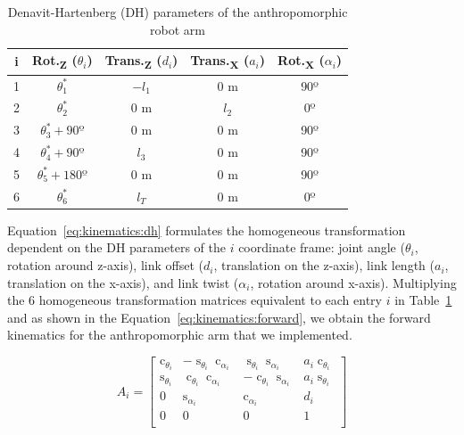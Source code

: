 \documentclass[10pt,a4paper,notitlepage,twocolumn,twoside]{article}
\DeclareMathOperator{\ssin}{s}
\DeclareMathOperator{\scos}{c}
\begin{document}
\begin{table}[!t]
  \renewcommand{\arraystretch}{1.25}
  \setlength{\tabcolsep}{2pt}
  \caption{Denavit-Hartenberg (DH) parameters of the anthropomorphic robot arm}
  \label{tab:kinematics:dh}
  \centering
  \begin{tabular}{c | c c c c}

\hline
\textbf{i} & \textbf{Rot.\textsubscript{Z}} ($\theta_i$) & \textbf{Trans.\textsubscript{Z}} ($d_i$) & \textbf{Trans.\textsubscript{X}} ($a_i$) & \textbf{Rot.\textsubscript{X}} ($\alpha_i$)\\
\hline
1 & $\theta_1^*$             & $-l_1$ & 0 m   & 90º\\
2 & $\theta_2^*$             & 0 m    & $l_2$ & 0º\\
3 & $\theta_3^*+90\text{º}$  & 0 m    & 0 m   & 90º\\
4 & $\theta_4^*+90\text{º}$  & $l_3$  & 0 m   & 90º\\
5 & $\theta_5^*+180\text{º}$ & 0 m    & 0 m   & 90º\\
6 & $\theta_6^*$             & $l_T$  & 0 m   & 0º\\
\hline

  \end{tabular}
\end{table}

Equation~\ref{eq:kinematics:dh} formulates the homogeneous transformation dependent on the DH parameters of the $i$ coordinate frame: joint angle ($\theta_i$, rotation around z-axis), link offset ($d_i$, translation on the z-axis), link length ($a_i$, translation on the x-axis), and link twist ($\alpha_i$, rotation around x-axis). Multiplying the 6 homogeneous transformation matrices equivalent to each entry $i$ in Table~\ref{tab:kinematics:dh} and as shown in the Equation~\ref{eq:kinematics:forward}, we obtain the forward kinematics for the anthropomorphic arm that we implemented.

\begin{equation}\label{eq:kinematics:dh}
A_i = \begin{bmatrix}
\scos_{\theta_i} & -\ssin_{\theta_i}\scos_{\alpha_i} &  \ssin_{\theta_i}\ssin_{\alpha_i} & a_i \scos_{\theta_i}\\
\ssin_{\theta_i} &  \scos_{\theta_i}\scos_{\alpha_i} & -\scos_{\theta_i}\ssin_{\alpha_i} & a_i \ssin_{\theta_i}\\
0                &  \ssin_{\alpha_i}                 &  \scos_{\alpha_i}                 & d_i \\
0                &  0                                &  0                                & 1\\
\end{bmatrix}
\end{equation}
\end{document}
